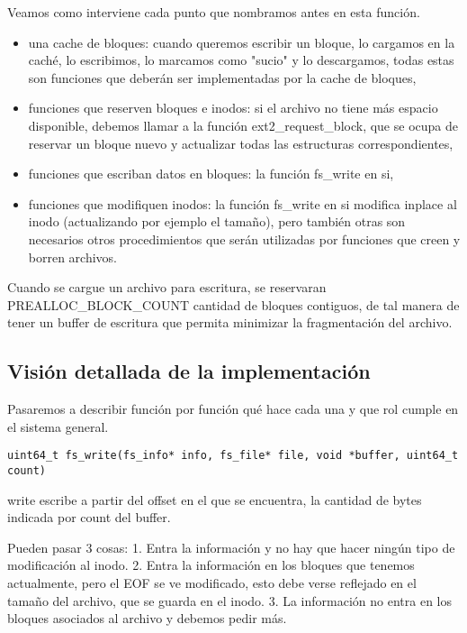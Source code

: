 Veamos como interviene cada punto que nombramos antes en esta función.

\begin{itemize}
  \item una cache de bloques: cuando queremos escribir un bloque, lo cargamos en la caché, lo escribimos, lo marcamos como "sucio" y lo descargamos, todas estas son funciones que deberán ser implementadas por la cache de bloques,
  \item funciones que reserven bloques e inodos: si el archivo no tiene más espacio disponible, debemos llamar a la función ext2\_request\_block, que se ocupa de reservar un bloque nuevo y actualizar todas las estructuras correspondientes,
  \item funciones que escriban datos en bloques: la función fs\_write en si,
  \item funciones que modifiquen inodos: la función fs\_write en si modifica inplace al inodo (actualizando por ejemplo el tamaño), pero también otras son necesarios otros procedimientos que serán utilizadas por funciones que creen y borren archivos.
\end{itemize}


Cuando se cargue un archivo para escritura, se reservaran PREALLOC\_BLOCK\_COUNT cantidad de bloques contiguos, de tal manera de tener un buffer de escritura que permita minimizar la fragmentación del archivo.

\subsection{Visión detallada de la implementación}

Pasaremos a describir función por función qu\'e hace cada una y que rol cumple en el sistema general.

\begin{lstlisting}[style=customc]
uint64_t fs_write(fs_info* info, fs_file* file, void *buffer, uint64_t count)
\end{lstlisting}

write escribe a partir del offset en el que se encuentra, la cantidad de bytes indicada por count del buffer.

Pueden pasar 3 cosas:
1. Entra la información y no hay que hacer ningún tipo de modificación al inodo.
2. Entra la información en los bloques que tenemos actualmente, pero el EOF se ve modificado, esto debe verse reflejado en el tamaño del archivo, que se guarda en el inodo.
3. La información no entra en los bloques asociados al archivo y debemos pedir más.

